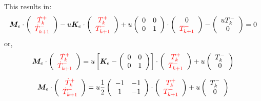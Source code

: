 This results in:
\begin{eqnarray}
{\bm M}_e 
\cdot
\left(
\begin{array}{cc}
{\color{red}\dot T_k^+}  \\
{\color{red} \dot T_{k+1}^-} 
\end{array}
\right) 
-u {\bm K}_e \cdot \left(
\begin{array}{cc}
     {\color{red}T_k^+}  \\
     {\color{red}T_{k+1}^-} 
\end{array}
\right) + 
u
\left( 
\begin{array}{cc}
0 & 0 \\
0 & 1 
\end{array}
\right)
\cdot
\left( 
\begin{array}{c}
0   \\
{\color{red}T_{k+1}^-} 
\end{array}
\right)
-\left(
\begin{array}{cc}
     u{T_{k}^-}   \\
     0 
\end{array}
\right)=0
\end{eqnarray}
or,
\begin{eqnarray}
{\bm M}_e \cdot
\left(
\begin{array}{cc}
{\color{red}\dot T_k^+}  \\
{\color{red} \dot T_{k+1}^-} 
\end{array}
\right) 
=
u \left[ {\bm K}_e -
\left(\begin{array}{cc}
0 & 0 \\
0 & 1 
\end{array}\right)
\right] \cdot 
\left( \begin{array}{cc}
{\color{red}T_k^+}  \\
{\color{red}T_{k+1}^-} 
\end{array} \right) 
+u \left( \begin{array}{cc}
{T_{k}^-}   \\  0 
\end{array} \right)
\end{eqnarray}


\begin{eqnarray}
{\bm M}_e \cdot
\left(
\begin{array}{cc}
{\color{red}\dot T_k^+}  \\
{\color{red} \dot T_{k+1}^-} 
\end{array}
\right) 
=
u\frac{1}{2}  
\left(\begin{array}{cc}
-1 & -1 \\
1 & -1 
\end{array}\right)
 \cdot 
\left( \begin{array}{cc}
{\color{red}T_k^+}  \\
{\color{red}T_{k+1}^-} 
\end{array} \right) 
+u \left( \begin{array}{cc}
{T_{k}^-}   \\  0 
\end{array} \right)
\end{eqnarray}

